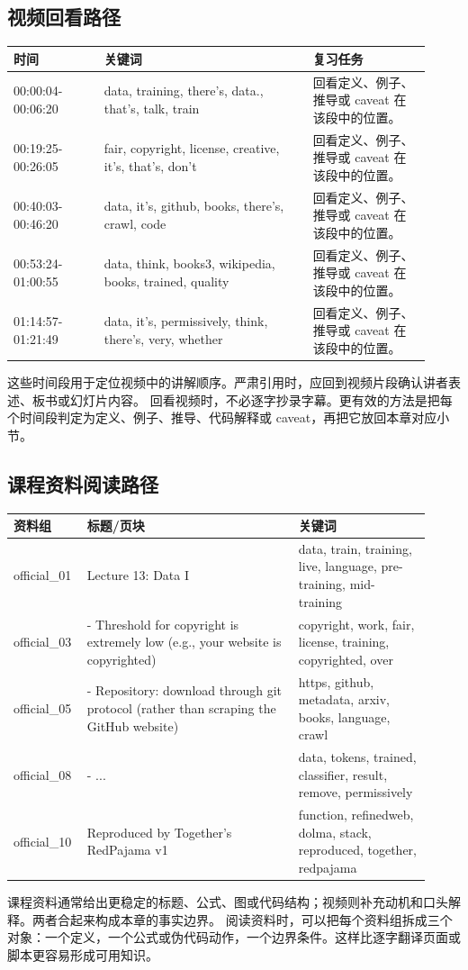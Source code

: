 \documentclass[a4paper]{article}
\begin{document}
\subsection{视频回看路径}
\begin{longtable}{p{0.20\linewidth}p{0.46\linewidth}p{0.26\linewidth}}
\toprule
\textbf{时间} & \textbf{关键词} & \textbf{复习任务}\\
\midrule
00:00:04-00:06:20 & data, training, there's, data., that's, talk, train & 回看定义、例子、推导或 caveat 在该段中的位置。\\
00:19:25-00:26:05 & fair, copyright, license, creative, it's, that's, don't & 回看定义、例子、推导或 caveat 在该段中的位置。\\
00:40:03-00:46:20 & data, it's, github, books, there's, crawl, code & 回看定义、例子、推导或 caveat 在该段中的位置。\\
00:53:24-01:00:55 & data, think, books3, wikipedia, books, trained, quality & 回看定义、例子、推导或 caveat 在该段中的位置。\\
01:14:57-01:21:49 & data, it's, permissively, think, there's, very, whether & 回看定义、例子、推导或 caveat 在该段中的位置。\\
\bottomrule
\end{longtable}
这些时间段用于定位视频中的讲解顺序。严肃引用时，应回到视频片段确认讲者表述、板书或幻灯片内容。
回看视频时，不必逐字抄录字幕。更有效的方法是把每个时间段判定为定义、例子、推导、代码解释或 caveat，再把它放回本章对应小节。
\subsection{课程资料阅读路径}
\begin{longtable}{p{0.14\linewidth}p{0.48\linewidth}p{0.30\linewidth}}
\toprule
\textbf{资料组} & \textbf{标题/页块} & \textbf{关键词}\\
\midrule
official\_01 & Lecture 13: Data I & data, train, training, live, language, pre-training, mid-training\\
official\_03 & - Threshold for copyright is extremely low (e.g., your website is copyrighted) & copyright, work, fair, license, training, copyrighted, over\\
official\_05 & - Repository: download through git protocol (rather than scraping the GitHub website) & https, github, metadata, arxiv, books, language, crawl\\
official\_08 & - ... & data, tokens, trained, classifier, result, remove, permissively\\
official\_10 & Reproduced by Together's RedPajama v1 & function, refinedweb, dolma, stack, reproduced, together, redpajama\\
\bottomrule
\end{longtable}
课程资料通常给出更稳定的标题、公式、图或代码结构；视频则补充动机和口头解释。两者合起来构成本章的事实边界。
阅读资料时，可以把每个资料组拆成三个对象：一个定义，一个公式或伪代码动作，一个边界条件。这样比逐字翻译页面或脚本更容易形成可用知识。
\end{document}
